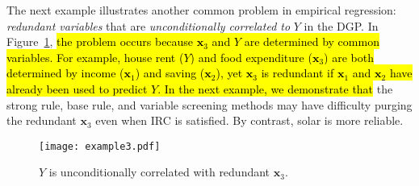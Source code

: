\documentclass[11pt,review,authoryear]{elsarticle}
\begin{document}
\medskip

The next example illustrates another common problem in empirical regression: \emph{redundant variables} that are \emph{unconditionally correlated to} $Y$ in the DGP. In Figure~\ref{fig:cond_example}, \hl{the problem occurs because $\mathbf{x}_3$ and $Y$ are determined by common variables. For example, house rent ($Y$) and food expenditure ($\mathbf{x}_3$) are both determined by income ($\mathbf{x}_1$) and saving ($\mathbf{x}_2$), yet $\mathbf{x}_3$ is redundant if $\mathbf{x}_1$ and $\mathbf{x}_2$ have already been used to predict $Y$. In the next example, we demonstrate that} the strong rule, base rule, and variable screening methods may have difficulty purging the redundant $\mathbf{x}_3$ even when IRC is satisfied. By contrast, solar is more reliable.

\begin{figure}[h]
    \centering
    \texttt{[image: example3.pdf]}
    \caption{$Y$ is unconditionally correlated with redundant $\mathbf{x}_3$.}
    \label{fig:cond_example}
  \end{figure}
\end{document}
